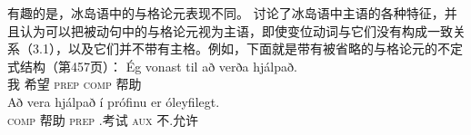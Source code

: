 \noindent
有趣的是，冰岛语中的与格论元表现不同。 \citet{ZMT85a}讨论了冰岛语中主语的各种特征，并且认为可以把被动句中的与格论元视为主语，即使变位动词与它们没有构成一致关系（3.1），以及它们并不带有主格。例如，下面就是带有被省略的与格论元的不定式结构（第457页）：
\eal
\ex 
\gll Ég vonast til  að verða hjálpað.\\
     我 希望    \textsc{prep} \textsc{comp} \passive{} 帮助\\
\ex
\gll Að vera hjálpað í prófinu er óleyfilegt.\\
     \textsc{comp} \passive{} 帮助 \textsc{prep} .考试 \textsc{aux} 不.允许\\
\zl

